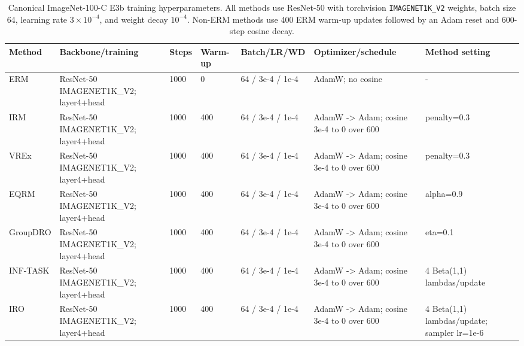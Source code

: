 \begin{table}[t]
\centering
\scriptsize
\caption{Canonical ImageNet-100-C E3b training hyperparameters. All methods use ResNet-50 with torchvision \texttt{IMAGENET1K\_V2} weights, batch size 64, learning rate $3\times10^{-4}$, and weight decay $10^{-4}$. Non-ERM methods use 400 ERM warm-up updates followed by an Adam reset and $600$-step cosine decay.}
\label{tab:imagenet100c-hyperparameters}
\begin{tabular}{@{}lllllll@{}}
\toprule
Method & Backbone/training & Steps & Warm-up & Batch/LR/WD & Optimizer/schedule & Method setting \\
\midrule
ERM & ResNet-50 IMAGENET1K_V2; layer4+head & 1000 & 0 & 64 / 3e-4 / 1e-4 & AdamW; no cosine & - \\
IRM & ResNet-50 IMAGENET1K_V2; layer4+head & 1000 & 400 & 64 / 3e-4 / 1e-4 & AdamW -> Adam; cosine 3e-4 to 0 over 600 & penalty=0.3 \\
VREx & ResNet-50 IMAGENET1K_V2; layer4+head & 1000 & 400 & 64 / 3e-4 / 1e-4 & AdamW -> Adam; cosine 3e-4 to 0 over 600 & penalty=0.3 \\
EQRM & ResNet-50 IMAGENET1K_V2; layer4+head & 1000 & 400 & 64 / 3e-4 / 1e-4 & AdamW -> Adam; cosine 3e-4 to 0 over 600 & alpha=0.9 \\
GroupDRO & ResNet-50 IMAGENET1K_V2; layer4+head & 1000 & 400 & 64 / 3e-4 / 1e-4 & AdamW -> Adam; cosine 3e-4 to 0 over 600 & eta=0.1 \\
INF-TASK & ResNet-50 IMAGENET1K_V2; layer4+head & 1000 & 400 & 64 / 3e-4 / 1e-4 & AdamW -> Adam; cosine 3e-4 to 0 over 600 & 4 Beta(1,1) lambdas/update \\
IRO & ResNet-50 IMAGENET1K_V2; layer4+head & 1000 & 400 & 64 / 3e-4 / 1e-4 & AdamW -> Adam; cosine 3e-4 to 0 over 600 & 4 Beta(1,1) lambdas/update; sampler lr=1e-6 \\
\bottomrule
\end{tabular}
\end{table}
